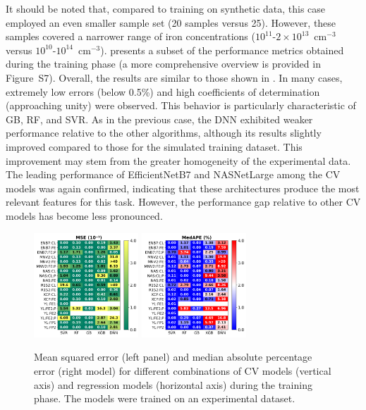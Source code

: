 \documentclass[10pt]{iopart}
\begin{document}
It should be noted that, compared to training on synthetic data, this case employed an even smaller sample set (20 samples versus 25).
However, these samples covered a narrower range of iron concentrations ($10^{11}$-$2\times10^{13}$~cm$^{-3}$ versus $10^{10}$-$10^{14}$~cm$^{-3}$).
 presents a subset of the performance metrics obtained during the training phase
(a more comprehensive overview is provided in Figure~S7).
Overall, the results are similar to those shown in .
In many cases, extremely low errors (below 0.5\%) and high coefficients of determination (approaching unity) were observed.
This behavior is particularly characteristic of GB, RF, and SVR.
As in the previous case, the DNN exhibited weaker performance relative to the other algorithms,
although its results slightly improved compared to those for the simulated training dataset.
This improvement may stem from the greater homogeneity of the experimental data.
The leading performance of EfficientNetB7 and NASNetLarge among the CV models was again confirmed,
indicating that these architectures produce the most relevant features for this task.
However, the performance gap relative to other CV models has become less pronounced.

\begin{figure}
\centering
\includegraphics[width=0.35\textwidth]{Fig9a}
\includegraphics[width=0.35\textwidth]{Fig9b}
\caption{
Mean squared error (left panel) and median absolute percentage error (right model) for different combinations of CV models (vertical axis)
and regression models (horizontal axis) during the training phase.
The models were trained on an experimental dataset.
}\label{Fig9}
\end{figure}
\end{document}
